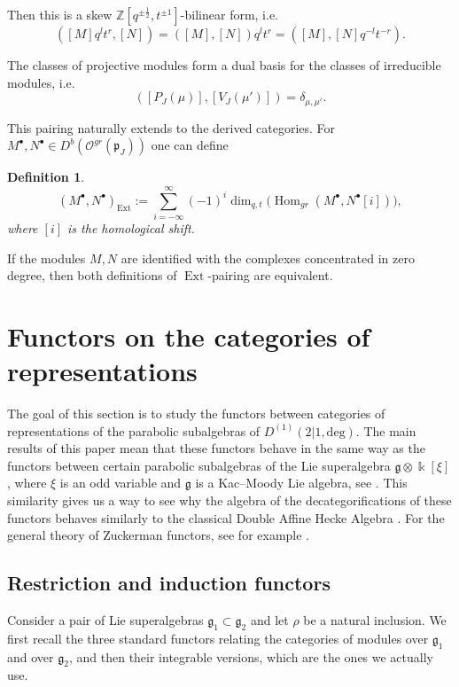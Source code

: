 \documentclass[10pt]{amsart}
\newtheorem{definition}[theorem]{Definition}
\newcommand{\fg}{{\mathfrak g}}
\newcommand{\fp}{{\mathfrak p}}
\newcommand{\Daff}{D^{(1)}(2|1,\mathrm{deg})}
\DeclareMathOperator{\Hom}{Hom}
\DeclareMathOperator{\Ext}{Ext}
\begin{document}
	Then this is a skew $\mathbb{Z}[q^{\pm \frac{1}{2}},t^{\pm 1}]$-bilinear form, i.e.\
	\[([M]q^lt^r,[N])=([M],[N])q^lt^r=([M],[N]q^{-l}t^{-r}).\]
	
	The classes of projective modules form a dual basis for the classes of irreducible modules, i.e.\
	\begin{equation*}
		([P_{J}(\mu)],[V_{J}(\mu')])=\delta_{\mu,\mu'}.
	\end{equation*}
	
	This pairing naturally extends to the derived categories. For $M^\bullet, N^\bullet \in D^b(\mathcal{O}^{gr}(\fp_{J}))$ one can define 
	
	\begin{definition}
		\[(M^\bullet,N^\bullet )_{\Ext}:=\sum_{i=-\infty}^{\infty}(-1)^i\dim_{q,t}\bigl(\Hom_{gr}(M^\bullet ,N^\bullet[i])\bigr),\]
		where $[i]$ is the homological shift. 
	\end{definition}
	
	If the modules $M,N$ are identified with the complexes concentrated in zero degree, then both definitions of $\Ext$-pairing are equivalent.
	
	\section{Functors on the categories of representations}\label{sec:Functors} 
	The goal of this section is to study the functors between categories of representations of the parabolic subalgebras of $\Daff$. The main results of this paper mean that these functors behave in the same way as the functors between certain parabolic subalgebras of the Lie superalgebra $\fg \otimes \Bbbk[\xi]$, where $\xi$ is an odd variable and $\fg$ is a Kac--Moody Lie algebra, see \cite{KKhM}. This similarity gives us a way to see why the algebra of the decategorifications of these functors behaves similarly to the classical Double Affine Hecke Algebra \cite{Cherednik-2005}. For the general theory of Zuckerman functors, see for example \cite{Vogan1981}.
	
	\subsection{Restriction and induction functors}
	Consider a pair of Lie superalgebras $\fg_1 \subset \fg_2$ and let $\rho$ be a natural inclusion. We first recall the three standard functors relating the categories of modules over $\fg_1$ and over $\fg_2$, and then their integrable versions, which are the ones we actually use.
	
\end{document}
